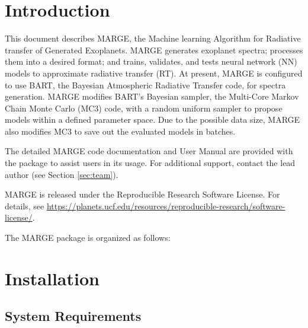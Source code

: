 \documentclass[letterpaper, 12pt]{article}
\begin{document}
\section{Introduction}
\label{sec:theory}

\noindent This document describes MARGE, the Machine learning Algorithm for Radiative 
transfer of Generated Exoplanets.  MARGE generates exoplanet spectra; processes 
them into a desired format; and trains, validates, and tests neural network (NN)
models to approximate radiative transfer (RT).  At present, MARGE is configured 
to use BART, the Bayesian Atmospheric Radiative Transfer code, for spectra 
generation.  MARGE modifies BART's Bayesian sampler, the Multi-Core Markov Chain
Monte Carlo (MC3) code, with a random uniform sampler to propose models within a
defined parameter space.  Due to the possible data size, MARGE also modifies MC3
to save out the evaluated models in batches.

\noindent The detailed MARGE code documentation and User Manual are provided 
with the package to assist users in its usage. For additional support, contact 
the lead author (see Section \ref{sec:team}).

\noindent MARGE is released under the Reproducible Research Software License.  
For details, see 
\url{https://planets.ucf.edu/resources/reproducible-research/software-license/}.

\noindent The MARGE package is organized as follows: \newline
\noindent{}
\vspace{0.7cm}

\section{Installation}
\label{sec:installation}

\subsection{System Requirements}
\label{sec:requirements}
\end{document}
